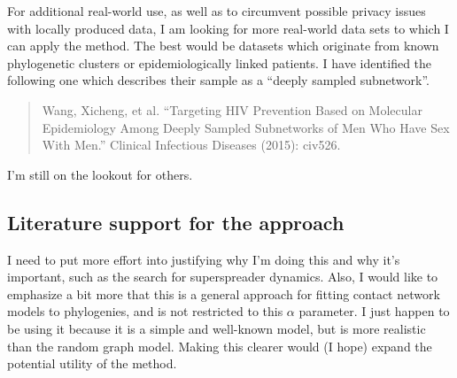 \documentclass{article}
\begin{document}
For additional real-world use, as well as to circumvent possible privacy issues
with locally produced data, I am looking for more real-world data sets to which
I can apply the method. The best would be datasets which originate from known
phylogenetic clusters or epidemiologically linked patients. I have identified
the following one which describes their sample as a ``deeply sampled
subnetwork''.

\begin{quote}
Wang, Xicheng, et al. ``Targeting HIV Prevention Based on Molecular
Epidemiology Among Deeply Sampled Subnetworks of Men Who Have Sex With Men.''
Clinical Infectious Diseases (2015): civ526.
\end{quote}

I'm still on the lookout for others.

\subsection*{Literature support for the approach}

I need to put more effort into justifying why I'm doing this and why it's
important, such as the search for superspreader dynamics. Also, I would like to
emphasize a bit more that this is a general approach for fitting contact
network models to phylogenies, and is not restricted to this $\alpha$
parameter. I just happen to be using it because it is a simple and well-known
model, but is more realistic than the random graph model. Making this clearer
would (I hope) expand the potential utility of the method.
\end{document}
